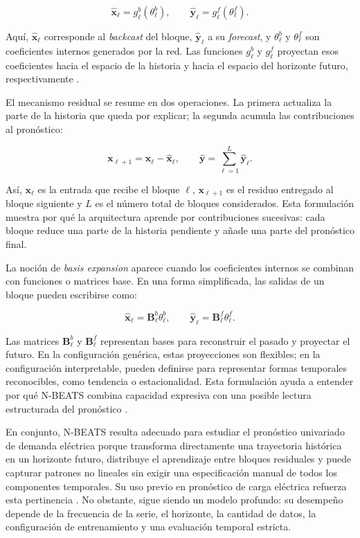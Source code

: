 \[
    \hat{\mathbf{x}}_{\ell} = g_{\ell}^{b}(\theta_{\ell}^{b}),
    \qquad
    \hat{\mathbf{y}}_{\ell} = g_{\ell}^{f}(\theta_{\ell}^{f}).
\]

Aquí, $\hat{\mathbf{x}}_{\ell}$ corresponde al \emph{backcast} del bloque, $\hat{\mathbf{y}}_{\ell}$ a su \emph{forecast}, y $\theta_{\ell}^{b}$ y $\theta_{\ell}^{f}$ son coeficientes internos generados por la red. Las funciones $g_{\ell}^{b}$ y $g_{\ell}^{f}$ proyectan esos coeficientes hacia el espacio de la historia y hacia el espacio del horizonte futuro, respectivamente \parencite{oreshkin2020}.

El mecanismo residual se resume en dos operaciones. La primera actualiza la parte de la historia que queda por explicar; la segunda acumula las contribuciones al pronóstico:

\[
    \mathbf{x}_{\ell+1} = \mathbf{x}_{\ell} - \hat{\mathbf{x}}_{\ell},
    \qquad
    \hat{\mathbf{y}} = \sum_{\ell=1}^{L} \hat{\mathbf{y}}_{\ell}.
\]

Así, $\mathbf{x}_{\ell}$ es la entrada que recibe el bloque $\ell$, $\mathbf{x}_{\ell+1}$ es el residuo entregado al bloque siguiente y $L$ es el número total de bloques considerados. Esta formulación muestra por qué la arquitectura aprende por contribuciones sucesivas: cada bloque reduce una parte de la historia pendiente y añade una parte del pronóstico final.

La noción de \emph{basis expansion} aparece cuando los coeficientes internos se combinan con funciones o matrices base. En una forma simplificada, las salidas de un bloque pueden escribirse como:

\[
    \hat{\mathbf{x}}_{\ell} = \mathbf{B}_{\ell}^{b}\theta_{\ell}^{b},
    \qquad
    \hat{\mathbf{y}}_{\ell} = \mathbf{B}_{\ell}^{f}\theta_{\ell}^{f}.
\]

Las matrices $\mathbf{B}_{\ell}^{b}$ y $\mathbf{B}_{\ell}^{f}$ representan bases para reconstruir el pasado y proyectar el futuro. En la configuración genérica, estas proyecciones son flexibles; en la configuración interpretable, pueden definirse para representar formas temporales reconocibles, como tendencia o estacionalidad. Esta formulación ayuda a entender por qué N-BEATS combina capacidad expresiva con una posible lectura estructurada del pronóstico \parencite{oreshkin2020}.

En conjunto, N-BEATS resulta adecuado para estudiar el pronóstico univariado de demanda eléctrica porque transforma directamente una trayectoria histórica en un horizonte futuro, distribuye el aprendizaje entre bloques residuales y puede capturar patrones no lineales sin exigir una especificación manual de todos los componentes temporales. Su uso previo en pronóstico de carga eléctrica refuerza esta pertinencia \parencite{oreshkin2021}. No obstante, sigue siendo un modelo profundo: su desempeño depende de la frecuencia de la serie, el horizonte, la cantidad de datos, la configuración de entrenamiento y una evaluación temporal estricta.

